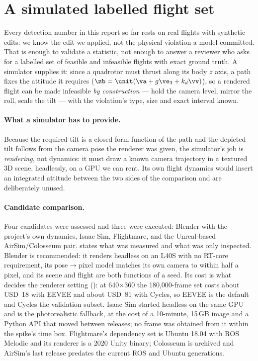 \section{A simulated labelled flight set}
\label{sec:i01-simset}

Every detection number in this report so far rests on real flights with synthetic edits: we
know the edit we applied, not the physical violation a model committed. That is enough to
validate a statistic, not enough to answer a reviewer who asks for a labelled set of feasible
and infeasible flights with exact ground truth. A simulator supplies it: since a quadrotor
must thrust along its body $z$ axis, a path fixes the attitude it requires
($\zb = \unit(\va + g\ve_3 + k_d \vv)$), so a rendered flight can be made infeasible
\emph{by construction} --- hold the camera level, mirror the roll, scale the tilt --- with the
violation's type, size and exact interval known.

\paragraph{What a simulator has to provide.} Because the required tilt is a closed-form
function of the path and the depicted tilt follows from the camera pose the renderer was
given, the simulator's job is \emph{rendering}, not dynamics: it must draw a known camera
trajectory in a textured 3D scene, headlessly, on a GPU we can rent. Its own flight dynamics
would insert an integrated attitude between the two sides of the comparison and are
deliberately unused.

\paragraph{Candidate comparison.} Four candidates were assessed and three were executed:
Blender with the project's own dynamics, Isaac Sim, Flightmare, and the Unreal-based
AirSim/Colosseum pair.  states what was measured and what was only
inspected. Blender is recommended: it renders headless on an L40S with no RT-core requirement,
its pose$\to$pixel model matches its own camera to within half a pixel, and its scene and
flight are both functions of a seed. Its cost is what decides the renderer setting
(): at 640$\times$360 the 180{,}000-frame set costs about USD~18 with
EEVEE and about USD~81 with Cycles, so EEVEE is the default and Cycles the validation subset.
Isaac Sim started headless on the same GPU and is the photorealistic fallback, at the cost of a
10-minute, 15\,GB image and a Python API that moved between releases; no frame was obtained
from it within the spike's time box. Flightmare's dependency set is Ubuntu 18.04 with ROS
Melodic and its renderer is a 2020 Unity binary; Colosseum is archived and AirSim's last
release predates the current ROS and Ubuntu generations.

